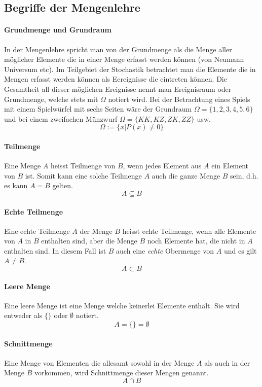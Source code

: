 \subsection{Begriffe der Mengenlehre}
\paragraph{Grundmenge und Grundraum}
In der Mengenlehre spricht man von der Grundmenge als die Menge aller
möglicher Elemente die in einer Menge erfasst werden können (von Neumann
Universum etc). Im Teilgebiet der Stochastik betrachtet man die
Elemente die in Mengen erfasst werden können als Eereignisse die eintreten
können. Die Gesamtheit all dieser möglichen Ereignisse nennt man 
\gls{Ereignisraum} oder Grundmenge, welche stets mit $\Omega$ 
notiert wird. 
Bei der Betrachtung eines Spiels mit einem Spielwürfel mit sechs Seiten 
wäre der Grundraum $\Omega=\{1,2,3,4,5,6\}$ und bei einem zweifachen
Münzwurf $\Omega=\{KK, KZ, ZK, ZZ\}$ usw.
\[  
	\Omega := \{x| P(x) \neq 0\}
\]

\paragraph{Teilmenge} 
Eine Menge $A$ heisst \gls{Teilmenge} von $B$, wenn jedes Element aus 
$A$ ein Element von $B$ ist. Somit kann eine solche Teilmenge $A$
auch die ganze Menge $B$ sein, d.h. es kann $A=B$ gelten.
\[ 
	A \subseteq B
\]
\paragraph{Echte Teilmenge}
Eine \gls{echte Teilmenge} $A$ der Menge $B$ heisst echte Teilmenge, wenn
alle Elemente von $A$ in $B$ enthalten sind, aber die Menge $B$ noch
Elemente hat, die nicht in $A$ enthalten sind. In diesem Fall ist $B$ 
auch eine \emph{echte} Obermenge von $A$ und es gilt $A \neq B$.
\[
	A \subset B
\]

\paragraph{Leere Menge} Eine \gls{leere Menge} ist eine Menge welche 
keinerlei Elemente enthält. Sie wird entweder als $\{ \}$ oder 
$\emptyset$ notiert.
\[  
	A = \{\} = \emptyset
\]

\paragraph{Schnittmenge} Eine Menge von Elementen die allesamt sowohl in
der Menge $A$ als auch in der Menge $B$ vorkommen, wird \gls{Schnittmenge} 
dieser Mengen genannt.
\[ 
	A \cap B
\]

